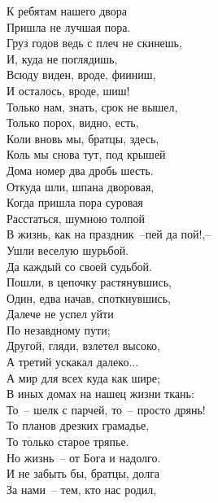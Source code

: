 \begin{scriptsize}
\begin{multicols}{2}
    
    \noindent
    К ребятам нашего двора \\
    Пришла не лучшая пора. \\
    \vfill
    \noindent
    Груз годов ведь с плеч не скинешь,\\
    И, куда не поглядишь,\\
    Всюду виден, вроде, фииниш,\\
    И осталось, вроде, шиш! \\
    \vfill
    \noindent
    Только нам, знать, срок не вышел,\\
    Только порох, видно, есть,\\
    Коли вновь мы, братцы, здесь,\\
    Коль мы снова тут, под крышей\\
    Дома номер два дробь шесть.\\
    \vfill
    \noindent
    Откуда шли, шпана дворовая,\\
    Когда пришла пора суровая\\
    Расстаться, шумною толпой\\
    В жизнь, как на праздник~--пей да пой!,--\\
    Ушли веселую шурьбой.\\
    Да каждый со своей судьбой.\\
    \vfill
    \noindent
    Пошли, в цепочку растянувшись,\\
    Один, едва начав, споткнувшись,\\
    Далече не успел уйти\\
    По незавдному пути;\\
    Другой, гляди, взлетел высоко,\\
    А третий ускакал далеко...\\
    \vfill   
    \noindent 
    А мир для всех куда как шире;\\
    В иных домах на нашец жизни ткань:\\
    То~-- шелк с парчей, то~-- просто дрянь!\\
    То планов дрезких грамадье,\\
    То только старое тряпье.\\
    \vfill
    \noindent
    Но жизнь~-- от Бога и надолго.\\
    И не забыть бы, братцы, долга\\
    За нами~-- тем, кто нас родил,\\

\end{multicols}
\end{scriptsize}
